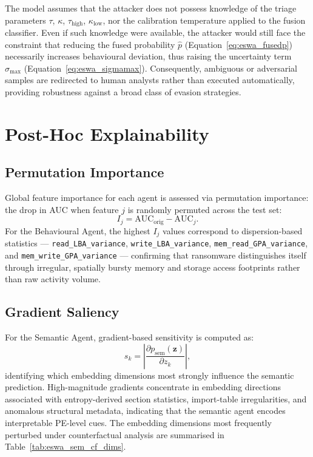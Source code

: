 The model assumes that the attacker does not possess knowledge of the triage parameters $\tau$, $\kappa$, $\tau_\text{high}$, $\kappa_\text{low}$, nor the calibration temperature applied to the fusion classifier. Even if such knowledge were available, the attacker would still face the constraint that reducing the fused probability $\hat{p}$ (Equation~\eqref{eq:eswa_fusedp}) necessarily increases behavioural deviation, thus raising the uncertainty term $\sigma_\text{max}$ (Equation~\eqref{eq:eswa_sigmamax}). Consequently, ambiguous or adversarial samples are redirected to human analysts rather than executed automatically, providing robustness against a broad class of evasion strategies.


\section{Post-Hoc Explainability}
\label{sec:eswa_explainability}

\subsection{Permutation Importance}

Global feature importance for each agent is assessed via permutation importance: the drop in AUC when feature $j$ is randomly permuted across the test set:
\begin{equation}
I_j = \text{AUC}_\text{orig} - \text{AUC}_j.
\label{eq:eswa_permimp}
\end{equation}
For the Behavioural Agent, the highest $I_j$ values correspond to dispersion-based statistics — \texttt{read\_LBA\_variance}, \texttt{write\_LBA\_variance}, \texttt{mem\_read\_GPA\_variance}, and \texttt{mem\_write\_GPA\_variance} — confirming that ransomware distinguishes itself through irregular, spatially bursty memory and storage access footprints rather than raw activity volume.

\subsection{Gradient Saliency}

For the Semantic Agent, gradient-based sensitivity is computed as:
\begin{equation}
s_k = \left|\frac{\partial p_\text{sem}(\mathbf{z})}{\partial z_k}\right|,
\label{eq:eswa_saliency}
\end{equation}
identifying which embedding dimensions most strongly influence the semantic prediction. High-magnitude gradients concentrate in embedding directions associated with entropy-derived section statistics, import-table irregularities, and anomalous structural metadata, indicating that the semantic agent encodes interpretable PE-level cues. The embedding dimensions most frequently perturbed under counterfactual analysis are summarised in Table~\ref{tab:eswa_sem_cf_dims}.


